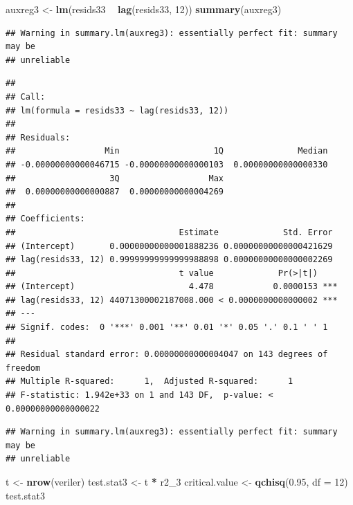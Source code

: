 \documentclass[]{article}
\newenvironment{Shaded}{\begin{snugshade}}{\end{snugshade}}
\newcommand{\KeywordTok}[1]{\textcolor[rgb]{0.13,0.29,0.53}{\textbf{#1}}}
\newcommand{\DataTypeTok}[1]{\textcolor[rgb]{0.13,0.29,0.53}{#1}}
\newcommand{\DecValTok}[1]{\textcolor[rgb]{0.00,0.00,0.81}{#1}}
\newcommand{\FloatTok}[1]{\textcolor[rgb]{0.00,0.00,0.81}{#1}}
\newcommand{\StringTok}[1]{\textcolor[rgb]{0.31,0.60,0.02}{#1}}
\newcommand{\OperatorTok}[1]{\textcolor[rgb]{0.81,0.36,0.00}{\textbf{#1}}}
\newcommand{\NormalTok}[1]{#1}
\begin{document}
\begin{Shaded}
\begin{Highlighting}[]
\NormalTok{auxreg3 <-}\StringTok{ }\KeywordTok{lm}\NormalTok{(resids33 }\OperatorTok{~}\StringTok{ }\KeywordTok{lag}\NormalTok{(resids33, }\DecValTok{12}\NormalTok{))}
\KeywordTok{summary}\NormalTok{(auxreg3)}
\end{Highlighting}
\end{Shaded}

\begin{verbatim}
## Warning in summary.lm(auxreg3): essentially perfect fit: summary may be
## unreliable
\end{verbatim}

\begin{verbatim}
## 
## Call:
## lm(formula = resids33 ~ lag(resids33, 12))
## 
## Residuals:
##                  Min                   1Q               Median 
## -0.00000000000046715 -0.00000000000000103  0.00000000000000330 
##                   3Q                  Max 
##  0.00000000000000887  0.00000000000004269 
## 
## Coefficients:
##                                 Estimate             Std. Error
## (Intercept)       0.00000000000001888236 0.00000000000000421629
## lag(resids33, 12) 0.99999999999999988898 0.00000000000000002269
##                                 t value             Pr(>|t|)    
## (Intercept)                       4.478            0.0000153 ***
## lag(resids33, 12) 44071300002187008.000 < 0.0000000000000002 ***
## ---
## Signif. codes:  0 '***' 0.001 '**' 0.01 '*' 0.05 '.' 0.1 ' ' 1
## 
## Residual standard error: 0.00000000000004047 on 143 degrees of freedom
## Multiple R-squared:      1,  Adjusted R-squared:      1 
## F-statistic: 1.942e+33 on 1 and 143 DF,  p-value: < 0.00000000000000022
\end{verbatim}

\begin{Shaded}
\end{Shaded}

\begin{verbatim}
## Warning in summary.lm(auxreg3): essentially perfect fit: summary may be
## unreliable
\end{verbatim}

\begin{Shaded}
\begin{Highlighting}[]
\NormalTok{t <-}\StringTok{ }\KeywordTok{nrow}\NormalTok{(veriler)}
\NormalTok{test.stat3 <-}\StringTok{ }\NormalTok{t }\OperatorTok{*}\StringTok{ }\NormalTok{r2_}\DecValTok{3}
\NormalTok{critical.value <-}\StringTok{ }\KeywordTok{qchisq}\NormalTok{(}\FloatTok{0.95}\NormalTok{, }\DataTypeTok{df =} \DecValTok{12}\NormalTok{)}
\NormalTok{test.stat3}
\end{Highlighting}
\end{Shaded}
\end{document}
